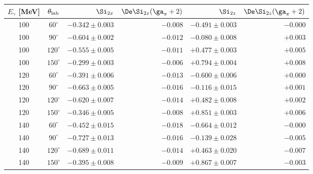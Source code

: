 \begin{tabular}{ccrrrr}
\hline
$E_\gamma$ [MeV] & $\theta_{\rm lab}$ & $\Si_{2x}$ & $\De\Si_{2x}(\ga_\pi+2)$ & $\Si_{2z}$ & $\De\Si_{2z}(\ga_\pi+2)$ \\
\hline
100 & $60^\circ$ & $-0.342 \pm 0.003$ & $-0.008$ & $-0.491 \pm 0.003$ & $-0.000$ \\
100 & $90^\circ$ & $-0.604 \pm 0.002$ & $-0.012$ & $-0.080 \pm 0.008$ & $+0.003$ \\
100 & $120^\circ$ & $-0.555 \pm 0.005$ & $-0.011$ & $+0.477 \pm 0.003$ & $+0.005$ \\
100 & $150^\circ$ & $-0.299 \pm 0.003$ & $-0.006$ & $+0.794 \pm 0.004$ & $+0.008$ \\
120 & $60^\circ$ & $-0.391 \pm 0.006$ & $-0.013$ & $-0.600 \pm 0.006$ & $+0.000$ \\
120 & $90^\circ$ & $-0.663 \pm 0.005$ & $-0.016$ & $-0.116 \pm 0.015$ & $+0.001$ \\
120 & $120^\circ$ & $-0.620 \pm 0.007$ & $-0.014$ & $+0.482 \pm 0.008$ & $+0.002$ \\
120 & $150^\circ$ & $-0.346 \pm 0.005$ & $-0.008$ & $+0.851 \pm 0.003$ & $+0.006$ \\
140 & $60^\circ$ & $-0.452 \pm 0.015$ & $-0.018$ & $-0.664 \pm 0.012$ & $-0.000$ \\
140 & $90^\circ$ & $-0.727 \pm 0.013$ & $-0.016$ & $-0.139 \pm 0.028$ & $-0.005$ \\
140 & $120^\circ$ & $-0.689 \pm 0.011$ & $-0.014$ & $+0.463 \pm 0.020$ & $-0.007$ \\
140 & $150^\circ$ & $-0.395 \pm 0.008$ & $-0.009$ & $+0.867 \pm 0.007$ & $-0.003$ \\
\hline
\end{tabular}
